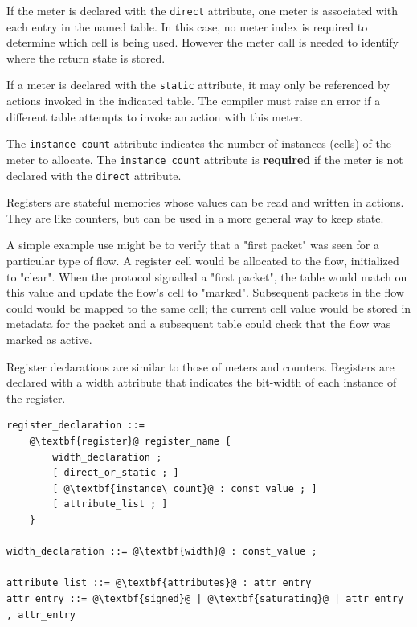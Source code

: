 \documentclass[12pt]{article}
\begin{document}
If the meter is declared with the \texttt{direct} attribute, one meter
is associated with each entry in the named table. In this case, no
meter index is required to determine which cell is being used. However
the meter call is needed to identify where the return state is stored.

If a meter is declared with the \texttt{static} attribute, it may only
be referenced by actions invoked in the indicated table. The compiler
must raise an error if a different table attempts to invoke an action
with this meter.

The \texttt{instance_count} attribute indicates the number of
instances (cells) of the meter to allocate.  The
\texttt{instance_count} attribute is \textbf{required} if the meter
is not declared with the \texttt{direct} attribute.


Registers are stateful memories whose values can be read and written
in actions.  They are like counters, but can be used in a more general
way to keep state.

A simple example use might be to verify that a "first packet" was seen
for a particular type of flow. A register cell would be allocated to
the flow, initialized to "clear". When the protocol signalled a "first
packet", the table would match on this value and update the flow's
cell to "marked".  Subsequent packets in the flow could would be
mapped to the same cell; the current cell value would be stored in
metadata for the packet and a subsequent table could check that the
flow was marked as active.

Register declarations are similar to those of meters and
counters. {\color{red} Registers are declared with a width
attribute that indicates the bit-width of each instance of
the register.}

\begin{lstlisting}[frame=single,backgroundcolor=\color{bnfgreen},escapechar=\@]
register_declaration ::= 
    @\textbf{register}@ register_name {
        width_declaration ;
        [ direct_or_static ; ]
        [ @\textbf{instance\_count}@ : const_value ; ]
        [ attribute_list ; ]
    }

width_declaration ::= @\textbf{width}@ : const_value ;

attribute_list ::= @\textbf{attributes}@ : attr_entry
attr_entry ::= @\textbf{signed}@ | @\textbf{saturating}@ | attr_entry , attr_entry
\end{lstlisting}
\end{document}
